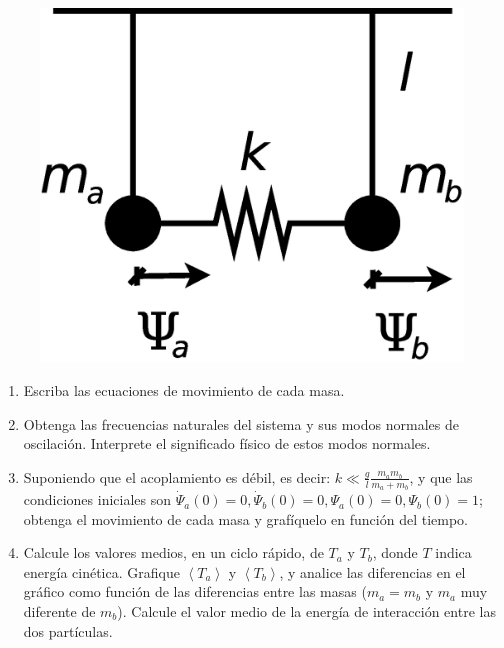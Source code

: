 \documentclass[11pt,spanish,a4paper]{article}
\begin{document}
\begin{enumerate}
\begin{figure}[H]
\centering{}\includegraphics[clip,scale=0.3]{ej1-7}
\end{figure}

\begin{enumerate}
	\item Escriba las ecuaciones de movimiento de cada masa. 
	\item Obtenga las frecuencias naturales del sistema y sus modos normales de oscilación.
	Interprete el significado físico de estos modos normales. 
	\item Suponiendo que el acoplamiento es débil, es decir: $k \ll \frac{g}{l} \frac{m_a m_b}{m_a+ m_b}$, y que las condiciones iniciales son $\dot{\Psi}_a(0)= 0, \dot{\Psi}_b(0)= 0,\Psi_a(0)= 0, \Psi_b(0)= 1$; obtenga el movimiento de cada masa y grafíquelo en función del tiempo. 
	\item Calcule los valores medios, en un ciclo rápido, de $T_{a}$ y $T_{b}$, donde $T$ indica energía cinética.
	Grafique $\left\langle T_{a}\right\rangle $ y $\left\langle T_{b}\right\rangle $, y analice las diferencias en el gráfico como función de las diferencias entre las masas ($m_a= m_b$ y $m_a$ muy diferente de $m_b$).
	Calcule el valor medio de la energía de interacción entre las dos partículas.
\end{enumerate}



\end{enumerate}
\end{document}
